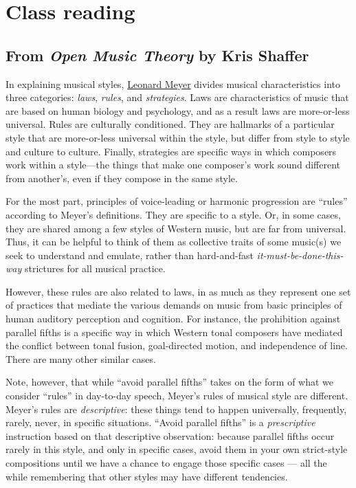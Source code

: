 \documentclass{book}
\begin{document}
\hypertarget{class-reading}{%
\chapter{Class reading}\label{class-reading}}

\hypertarget{from-open-music-theory-by-kris-shaffer}{%
\section{\texorpdfstring{From \emph{Open Music Theory} by Kris
Shaffer}{From Open Music Theory by Kris Shaffer}}\label{from-open-music-theory-by-kris-shaffer}}

In explaining musical styles,
\href{https://openlibrary.org/works/OL3267613W/Style_and_music}{Leonard Meyer}
divides musical characteristics into three categories: \emph{laws},
\emph{rules}, and \emph{strategies}. Laws are characteristics of music that
are based on human biology and psychology, and as a result laws are
more-or-less universal. Rules are culturally conditioned. They are hallmarks
of a particular style that are more-or-less universal within the style, but
differ from style to style and culture to culture. Finally, strategies are
specific ways in which composers work within a style---the things that make
one composer's work sound different from another's, even if they compose in
the same style.

For the most part, principles of voice-leading or harmonic progression are
``rules'' according to Meyer's definitions. They are specific to a style. Or,
in some cases, they are shared among a few styles of Western music, but are
far from universal. Thus, it can be helpful to think of them as collective
traits of some music(s) we seek to understand and emulate, rather than
hard-and-fast \emph{it-must-be-done-this-way} strictures for all musical
practice.

However, these rules are also related to laws, in as much as they represent
one set of practices that mediate the various demands on music from basic
principles of human auditory perception and cognition. For instance, the
prohibition against parallel fifths is a specific way in which Western tonal
composers have mediated the conflict between tonal fusion, goal-directed
motion, and independence of line. There are many other similar cases.

Note, however, that while ``avoid parallel fifths'' takes on the form of what
we consider ``rules'' in day-to-day speech, Meyer's rules of musical style are
different. Meyer's rules are \emph{descriptive}: these things tend to happen
universally, frequently, rarely, never, in specific situations. ``Avoid
parallel fifths'' is a \emph{prescriptive} instruction based on that
descriptive observation: because parallel fifths occur rarely in this style,
and only in specific cases, avoid them in your own strict-style compositions
until we have a chance to engage those specific cases --- all the while
remembering that other styles may have different tendencies.
\end{document}
